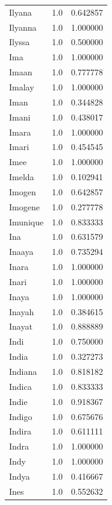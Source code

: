 \documentclass[
  letterpaper,
  DIV=11,
  numbers=noendperiod]{scrreprt}
\begin{document}
\begin{tabular}{lrr}
Ilyana          &   1.0 &   0.642857 \\
Ilyanna         &   1.0 &   1.000000 \\
Ilyssa          &   1.0 &   0.500000 \\
Ima             &   1.0 &   1.000000 \\
Imaan           &   1.0 &   0.777778 \\
Imalay          &   1.0 &   1.000000 \\
Iman            &   1.0 &   0.344828 \\
Imani           &   1.0 &   0.438017 \\
Imara           &   1.0 &   1.000000 \\
Imari           &   1.0 &   0.454545 \\
Imee            &   1.0 &   1.000000 \\
Imelda          &   1.0 &   0.102941 \\
Imogen          &   1.0 &   0.642857 \\
Imogene         &   1.0 &   0.277778 \\
Imunique        &   1.0 &   0.833333 \\
Ina             &   1.0 &   0.631579 \\
Inaaya          &   1.0 &   0.735294 \\
Inara           &   1.0 &   1.000000 \\
Inari           &   1.0 &   1.000000 \\
Inaya           &   1.0 &   1.000000 \\
Inayah          &   1.0 &   0.384615 \\
Inayat          &   1.0 &   0.888889 \\
Indi            &   1.0 &   0.750000 \\
India           &   1.0 &   0.327273 \\
Indiana         &   1.0 &   0.818182 \\
Indica          &   1.0 &   0.833333 \\
Indie           &   1.0 &   0.918367 \\
Indigo          &   1.0 &   0.675676 \\
Indira          &   1.0 &   0.611111 \\
Indra           &   1.0 &   1.000000 \\
Indy            &   1.0 &   1.000000 \\
Indya           &   1.0 &   0.416667 \\
Ines            &   1.0 &   0.552632 \\

\end{tabular}
\end{document}
